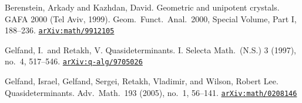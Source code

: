 \documentclass[12pt,twoside]{article}
\newcommand\arxivref[1]{\href{http://arxiv.org/abs/#1}{\tt arXiv:#1}}
\theoremstyle{plain} %
\theoremstyle{definition} %
\theoremstyle{definition} %
\numberwithin{theorem}{section}
\numberwithin{equation}{section}
\numberwithin{figure}{section}
\numberwithin{table}{section}
\begin{document}
\begin{thebibliography}{99}

Berenstein, Arkady and Kazhdan, David. 
Geometric and unipotent crystals. 
GAFA 2000 (Tel Aviv, 1999). 
Geom.\ Funct.\ Anal.\ 2000, Special Volume, Part I, 188--236.
\arxivref{math/9912105}


%
%

Gelfand, I.\ and Retakh, V. 
Quasideterminants. I. 
Selecta Math.\ (N.S.) 3 (1997), no.~4, 517--546.
\arxivref{q-alg/9705026}

Gelfand, Israel, Gelfand, Sergei, Retakh, Vladimir, and Wilson, Robert Lee. Quasideterminants. 
Adv.\ Math.\ 193 (2005), no.~1, 56--141.
\arxivref{math/0208146}

%
%
%
%


\end{thebibliography}
\end{document}
